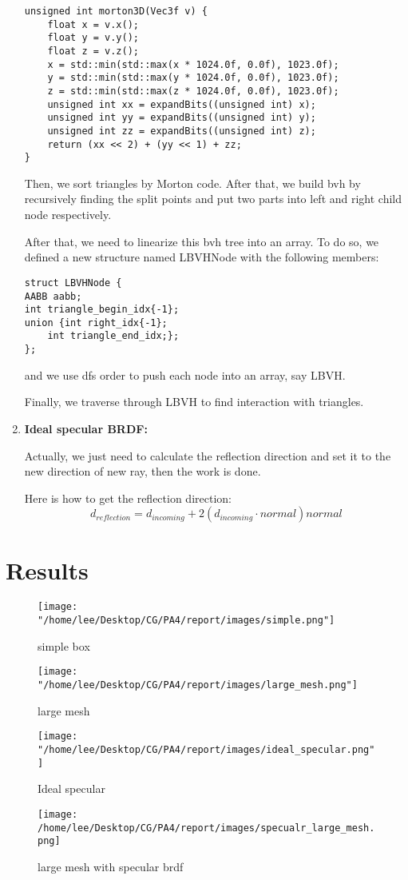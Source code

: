 \documentclass[acmtog]{acmart}
\begin{document}
\begin{enumerate}
\begin{lstlisting}
unsigned int morton3D(Vec3f v) {
	float x = v.x();
	float y = v.y();
	float z = v.z();
	x = std::min(std::max(x * 1024.0f, 0.0f), 1023.0f);
	y = std::min(std::max(y * 1024.0f, 0.0f), 1023.0f);
	z = std::min(std::max(z * 1024.0f, 0.0f), 1023.0f);
	unsigned int xx = expandBits((unsigned int) x);
	unsigned int yy = expandBits((unsigned int) y);
	unsigned int zz = expandBits((unsigned int) z);
	return (xx << 2) + (yy << 1) + zz;
}
	\end{lstlisting}
	\par Then, we sort triangles by Morton code. After that, we build bvh
	by recursively finding the split points and put two parts into left and right child node respectively.
	\par After that, we need to linearize this bvh tree into an array. To do so, we defined a new structure named LBVHNode with the following members:
	\begin{lstlisting}
struct LBVHNode {
AABB aabb;
int triangle_begin_idx{-1};
union {int right_idx{-1};
	int triangle_end_idx;};
};
	\end{lstlisting}
	and we use dfs order to push each node into an array, say LBVH.
	\par Finally, we traverse through LBVH to find interaction with triangles.
	\item {\bf Ideal specular BRDF:}
	\par Actually, we just need to calculate the reflection direction and set it to the new direction of new ray, then the work is done.
	\par Here is how to get the reflection direction:
	\[d_{reflection}=d_{incoming}+2(d_{incoming}\cdot normal)normal\]
\end{enumerate}
\section{Results}
\begin{figure}[H]
	\centering
	\texttt{[image: "/home/lee/Desktop/CG/PA4/report/images/simple.png"]}
	\caption{simple box}
\end{figure}
\begin{figure}[H]
	\centering
	\texttt{[image: "/home/lee/Desktop/CG/PA4/report/images/large\_mesh.png"]}
	\caption{large mesh}
\end{figure}
\begin{figure}[H]
	\centering
	\texttt{[image: "/home/lee/Desktop/CG/PA4/report/images/ideal\_specular.png"]}
	\caption{Ideal specular}
\end{figure}
\begin{figure}[H]
	\centering
	\texttt{[image: /home/lee/Desktop/CG/PA4/report/images/specualr\_large\_mesh.png]}
	\caption{large mesh with specular brdf}
\end{figure}
\end{document}
